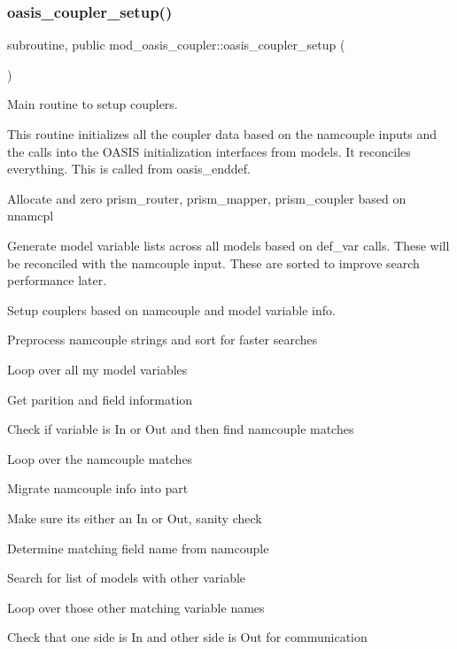 \subsubsection{\texorpdfstring{oasis\+\_\+coupler\+\_\+setup()}{oasis\_coupler\_setup()}}
{\footnotesize\ttfamily subroutine, public mod\+\_\+oasis\+\_\+coupler\+::oasis\+\_\+coupler\+\_\+setup (\begin{DoxyParamCaption}{ }\end{DoxyParamCaption})}



Main routine to setup couplers. 

This routine initializes all the coupler data based on the namcouple inputs and the calls into the O\+A\+S\+IS initialization interfaces from models. It reconciles everything. This is called from oasis\+\_\+enddef. 
\begin{DoxyItemize}
\item Allocate and zero prism\+\_\+router, prism\+\_\+mapper, prism\+\_\+coupler based on nnamcpl
\item Generate model variable lists across all models based on def\+\_\+var calls. These will be reconciled with the namcouple input. These are sorted to improve search performance later.
\item Setup couplers based on namcouple and model variable info.
\item Preprocess namcouple strings and sort for faster searches
\item Loop over all my model variables
\begin{DoxyItemize}
\item Get parition and field information
\item Check if variable is In or Out and then find namcouple matches
\item Loop over the namcouple matches
\begin{DoxyItemize}
\item Migrate namcouple info into part
\item Make sure it\textquotesingle{}s either an In or Out, sanity check
\item Determine matching field name from namcouple
\item Search for list of models with other variable
\item Loop over those other matching variable names
\begin{DoxyItemize}
\item Check that one side is In and other side is Out for communication

\end{DoxyItemize}
\end{DoxyItemize}
\end{DoxyItemize}
\end{DoxyItemize}
